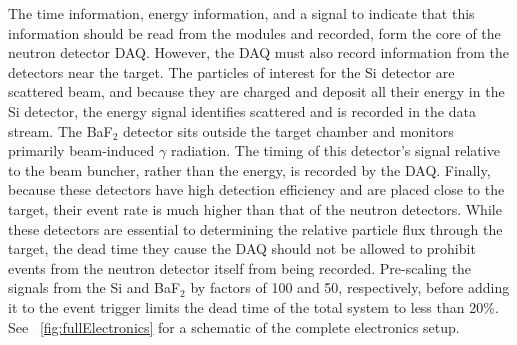 The time information, energy information, and a signal to indicate that this information should be read from the modules and recorded, form the core of the neutron detector DAQ.  However, the DAQ must also record information from the detectors near the target.  The particles of interest for the Si detector are scattered  beam, and because they are charged and deposit all their energy in the Si detector, the energy signal identifies scattered  and is recorded in the data stream.  The BaF$_2$ detector sits outside the target chamber and monitors primarily beam-induced $\gamma$ radiation.  The timing of this detector's signal relative to the beam buncher, rather than the energy, is recorded by the DAQ.  Finally, because these detectors have high detection efficiency and are placed close to the target, their event rate is much higher than that of the neutron detectors.  While these detectors are essential to determining the relative particle flux through the target, the dead time they cause the DAQ should not be allowed to prohibit events from the neutron detector itself from being recorded.  Pre-scaling the signals from the Si and BaF$_2$ by factors of 100 and 50, respectively, before adding it to the event trigger limits the dead time of the total system to less than 20\%.  See {\fig}~\ref{fig:fullElectronics} for a schematic of the complete electronics setup.
